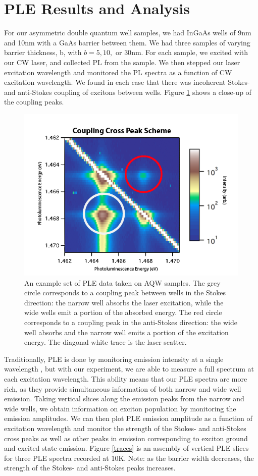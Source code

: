 \section{PLE Results and Analysis}
\indent For our asymmetric double quantum well samples, we had InGaAs wells of 9nm and 10nm with a GaAs barrier between them. We had three samples of varying barrier thickness, b, with $b=5,10,$ or $30$nm. For each sample, we excited with our CW laser, and collected PL from the sample. We then stepped our laser excitation wavelength and monitored the PL spectra as a function of CW excitation wavelength. We found in each case that there was incoherent Stokes- and anti-Stokes coupling of excitons between wells. Figure \ref{peakscheme} shows a close-up of the coupling peaks. 

\begin{figure}
\centering
\includegraphics[width = .8\textwidth]{crosspks.png}
\caption{ \doublespacing An example set of PLE data taken on AQW samples. The grey circle corresponds to a coupling peak between wells in the Stokes direction: the narrow well absorbs the laser excitation, while the wide wells emit a portion of the absorbed energy. The red circle corresponds to a coupling peak in the anti-Stokes direction: the wide well absorbs and the narrow well emits a portion of the excitation energy. The diagonal white trace is the laser scatter.}
\label{peakscheme}
\end{figure}

\indent Traditionally, PLE is done by monitoring emission intensity at a single wavelength \cite{borri}, but with our experiment, we are able to measure a full spectrum at each excitation wavelength. This ability means that our PLE spectra are more rich, as they provide simultaneous information of both narrow and wide well emission. Taking vertical slices along the emission peaks from the narrow and wide wells, we obtain information on exciton population by monitoring the emission amplitudes. We can then plot PLE emission amplitude as a function of excitation wavelength and monitor the strength of the Stokes- and anti-Stokes cross peaks as well as other peaks in emission corresponding to exciton ground and excited state emission. Figure \ref{traces} is an assembly of vertical PLE slices for three PLE spectra recorded at 10K. Note: as the barrier width decreases, the strength of the Stokes- and anti-Stokes peaks increases. 

